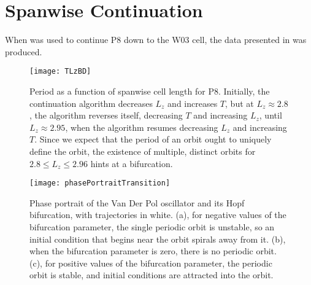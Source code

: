 \section{Spanwise Continuation}

When  was used to continue P8 down to the W03 cell, the data presented in  was produced.
\begin{figure}[t]
\texttt{[image: TLzBD]}
\caption{Period as a function of spanwise cell length for P8. Initially, the continuation algorithm decreases $L_z$ and increases $T$, but at $L_z \approx 2.8$, the algorithm reverses itself, decreasing $T$ and increasing $L_z$, until $L_z \approx 2.95$, when the algorithm resumes decreasing $L_z$ and increasing $T$. Since we expect that the period of an orbit ought to uniquely define the orbit, the existence of multiple, distinct orbits for $2.8 \leq L_z \leq 2.96$ hints at a bifurcation.}\label{fig:LZBif}
\end{figure}
\begin{figure}[t]
\texttt{[image: phasePortraitTransition]}
\caption{Phase portrait of the Van Der Pol oscillator and its Hopf bifurcation, with trajectories in white. (a), for negative values of the bifurcation parameter, the single periodic orbit is unstable, so an initial condition that begins near the orbit spirals away from it. (b), when the bifurcation parameter is zero, there is no periodic orbit. (c), for positive values of the bifurcation parameter, the periodic orbit is stable, and initial conditions are attracted into the orbit.}\label{fig:phasePortrait}
\end{figure}
